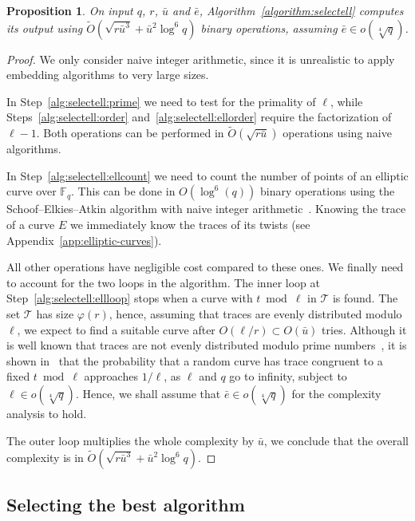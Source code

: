 \documentclass[12pt]{article}
\theoremstyle{plain}
\newtheorem{proposition}[theorem]{Proposition}
\theoremstyle{definition}
\newcommand{\tildO}{\tilde{O}}
\def\F{\ensuremath{\mathbb{F}}}
\def\euler{\ensuremath{\varphi}}
\newcounter{algorithm}
\begin{document}
\begin{proposition}
  On input $q$, $r$, $\bar{u}$ and $\bar{e}$,
  Algorithm~\ref{algorithm:selectell} computes its output using
  $\tildO\left(\sqrt{r\bar{u}^3} + \bar{u}^2\log^6{q}\right)$ binary
  operations, assuming $\bar{e}\in o(\sqrt[4]{q})$.
\end{proposition}
\begin{proof}
  We only consider naive integer arithmetic, since it is unrealistic
  to apply embedding algorithms to very large sizes.

  In Step~\ref{alg:selectell:prime} we need to test for the primality
  of $\ell$, while Steps~\ref{alg:selectell:order}
  and~\ref{alg:selectell:ellorder} require the factorization of
  $\ell-1$. Both operations can be performed in
  $\tildO(\sqrt{r\bar{u}})$ operations using naive algorithms.

  In Step~\ref{alg:selectell:ellcount} we need to count the number
  of points of an elliptic curve over $\F_q$. This can be done in
  $O\left(\log^6(q)\right)$ binary operations using the
  Schoof--Elkies--Atkin algorithm with naive integer
  arithmetic~\cite{schoof95,lercier+sirvent08}. Knowing the trace of a
  curve $E$ we immediately know the traces of its twists (see
  Appendix~\ref{app:elliptic-curves}).

  All other operations have negligible cost compared to these ones. We
  finally need to account for the two loops in the algorithm. The
  inner loop at Step~\ref{alg:selectell:ellloop} stops when a curve
  with $t\bmod\ell$ in $\mathcal{T}$ is found. The set $\mathcal{T}$
  has size $\euler(r)$, hence, assuming that traces are evenly
  distributed modulo $\ell$, we expect to find a suitable curve after
  $O(\ell/r)\subset O(\bar{u})$ tries. Although it is well known that
  traces are not evenly distributed modulo prime
  numbers~\cite{lenstra87}, it is shown
  in~\cite[Th.~1]{castryck+hubrechts13} that the probability that a
  random curve has trace congruent to a fixed $t\bmod\ell$ approaches
  $1/\ell$, as $\ell$ and $q$ go to infinity, subject to $\ell\in
  o(\sqrt[4]{q})$. Hence, we shall assume that $\bar{e}\in
  o(\sqrt[4]{q})$ for the complexity analysis to hold.

  The outer loop multiplies the whole complexity by $\bar{u}$, we
  conclude that the overall complexity is in
  $\tildO\left(\sqrt{r\bar{u}^3} + \bar{u}^2\log^6{q}\right)$.
\end{proof}


\subsection{Selecting the best algorithm}
\end{document}
